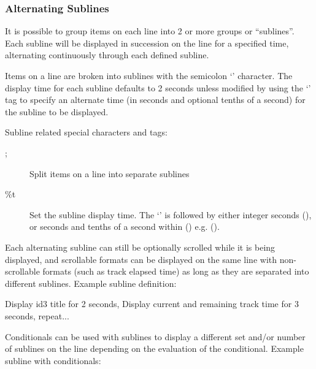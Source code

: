 \subsubsection{\label{ref:AlternatingSublines}Alternating Sublines}

It is possible to group items on each line into 2 or more groups or 
``sublines''. Each subline will be displayed in succession on the line for a 
specified time, alternating continuously through each defined subline.

Items on a line are broken into sublines with the semicolon
`\config{;}' character. The display time for
each subline defaults to 2 seconds unless modified by using the
`' tag to specify an alternate
time (in seconds and optional tenths of a second) for the subline to be
displayed. 

Subline related special characters and tags: 
\begin{description}
\item[;] Split items on a line into separate sublines
\item[\%t] Set the subline display time. The
`' is followed by either integer seconds (), or seconds
and tenths of a second within () e.g. ().
\end{description}

Each alternating subline can still be optionally scrolled while it is
being displayed, and scrollable formats can be displayed on the same
line with non{}-scrollable formats (such as track elapsed time) as long
as they are separated into different sublines.
Example subline definition:
\begin{example}
                                 Display id3 title for 2 seconds,
                                 Display current and remaining track time
                                 for 3 seconds,
                                 repeat...
\end{example}

Conditionals can be used with sublines to display a different set and/or number
of sublines on the line depending on the evaluation of the conditional.
Example subline with conditionals:
\begin{example}
\end{example}

